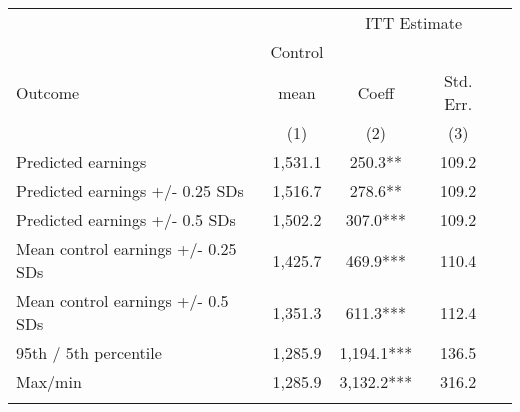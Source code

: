 \begin{tabular}{lcccc}
\hline \noalign{\smallskip} &  & \multicolumn{2}{c}{{ ITT Estimate}} & \\
\cline{3-4} & Control &  &  & \\
Outcome & mean & Coeff & Std. Err. & \\
 & (1) & (2) & (3) & \\
\noalign{\smallskip}\hline \noalign{\smallskip}Predicted earnings & 1,531.1 & 250.3** & 109.2 & \\
Predicted earnings +/- 0.25 SDs & 1,516.7 & 278.6** & 109.2 & \\
Predicted earnings +/- 0.5 SDs & 1,502.2 & 307.0*** & 109.2 & \\
Mean control earnings +/- 0.25 SDs & 1,425.7 & 469.9*** & 110.4 & \\
Mean control earnings +/- 0.5 SDs & 1,351.3 & 611.3*** & 112.4 & \\
95th / 5th percentile & 1,285.9 & 1,194.1*** & 136.5 & \\
Max/min & 1,285.9 & 3,132.2*** & 316.2 & \\
\noalign{\smallskip}\hline\end{tabular}\\
